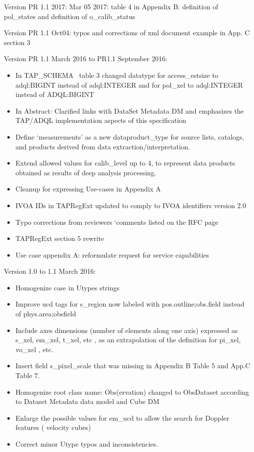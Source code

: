 \documentclass[11pt,a4paper]{ivoa}
\begin{document}
Version PR 1.1 2017: Mar 05 2017: table 4 in Appendix B: definition of pol\_states and definition of o\_calib\_status

Version PR 1.1 Oct04: typos and corrections of xml document example in App. C section 3

Version PR 1.1 March 2016 to PR1.1 September 2016:

\begin{itemize}
\item In TAP\_SCHEMA~ table 3 changed datatype for access\_estsize to adql:BIGINT instead of adql:INTEGER and for
pol\_xel to adql:INTEGER instead of ADQL:BIGINT
\item In Abstract: Clarified links with DataSet Metadata DM and emphasizes the TAP/ADQL implementation aspects of this
specification
\item Define `measurements' as a new dataproduct\_type for source lists, catalogs, and products derived from data
extraction/interpretation.
\item Extend allowed values for calib\_level up to 4, to represent data products obtained as results of deep analysis
processing.
\item Cleanup for expressing Use-cases in Appendix A
\item IVOA IDs in TAPRegExt updated to comply to IVOA identifiers version 2.0
\item Typo corrections from reviewers `comments listed on the RFC page
\item TAPRegExt section 5 rewrite
\item Use case appendix A: reformulate request for service capabilities
\end{itemize}
Version 1.0 to 1.1 March 2016:

\begin{itemize}
\item Homogenize case in Utypes strings
\item Improve ucd tags for s\_region now labeled with pos.outline;obs.field instead of phys.area;obsfield
\item Include axes dimensions (number of elements along one axis) expressed as s\_xel, em\_xel, t\_xel, etc , as an
extrapolation of the definition for pi\_xel, vo\_xel , etc.
\item Insert field s\_pixel\_scale that was missing in Appendix B Table 5 and App.C Table 7.
\item Homogenize root class name: Obs(ervation) changed to ObsDataset according to Dataset Metadata data model and Cube
DM
\item Enlarge the possible values for em\_ucd to allow the search for Doppler features ( velocity cubes)
\item Correct minor Utype typos and inconsistencies.
\end{itemize}
\end{document}
